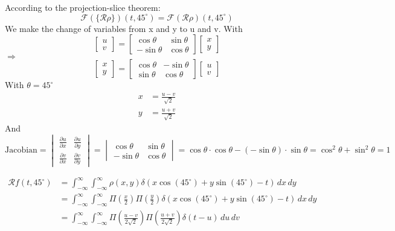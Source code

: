 \documentclass[12pt,twoside]{article}
\begin{document}
\begin{enumerate}
        According to the projection-slice theorem:
        \[
        		\mathcal{F} \left(   \{ \mathcal{R} \rho \} \right) (t,  45^{\circ}) = \mathcal{F} \left( \mathcal{R} \rho  \right) (t, 45^{\circ})
        \]
        We make the change of variables from x and y to u and v.
        With 
        \[
        \begin{bmatrix}
		u \\
		v
	\end{bmatrix}
	=
	\begin{bmatrix}
	\cos\theta & \sin\theta \\
	-\sin\theta & \cos\theta
	\end{bmatrix}   \begin{bmatrix}
		x \\
		y
	\end{bmatrix}
        \]  $\Rightarrow$
        \[
        \begin{bmatrix}
		x \\
		y
	\end{bmatrix}
	=
	\begin{bmatrix}
	\cos\theta & -\sin\theta \\
	\sin\theta & \cos\theta
	\end{bmatrix}   \begin{bmatrix}
		u \\
		v
	\end{bmatrix}
        \] 
        With $\theta=45^{\circ}$
        	 \begin{align*}
	 	x &= \frac{u-v}{\sqrt{2}} \\
	 	y &= \frac{u+v}{\sqrt{2}}
	 \end{align*}
	And
\[
\text{Jacobian} =
\begin{vmatrix}
\frac{\partial u}{\partial x} & \frac{\partial u}{\partial y} \\
\frac{\partial v}{\partial x} & \frac{\partial v}{\partial y}
\end{vmatrix}
=
\begin{vmatrix}
\cos\theta & \sin\theta \\
-\sin\theta & \cos\theta
\end{vmatrix}
= \cos\theta \cdot \cos\theta - (-\sin\theta) \cdot \sin\theta
= \cos^2\theta + \sin^2\theta = 1
\]

\begin{align*}
	\mathcal{R}f(t, 45^{\circ}) &= \int_{-\infty}^{\infty} \int_{-\infty}^{\infty} \rho(x, y) \delta(x \cos(45^\circ) + y \sin(45^\circ) - t) \, dx \, dy \\
	&= \int_{-\infty}^{\infty} \int_{-\infty}^{\infty} \Pi\left(\frac{x}{2}\right) \Pi\left(\frac{y}{2}\right) \delta\left(x \cos(45^\circ) + y \sin(45^\circ) - t\right) \, dx \, dy \\
	&= \int_{-\infty}^{\infty} \int_{-\infty}^{\infty} \Pi\left(\frac{u-v}{2 \sqrt{2}}\right) \Pi\left(\frac{u+v}{2 \sqrt{2}}\right) \delta\left(t - u\right) \, du \, dv
\end{align*}


\end{enumerate}
\end{document}
